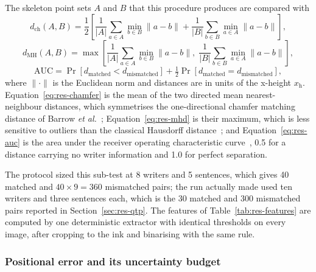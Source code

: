 The skeleton point sets $A$ and $B$ that this procedure produces are compared with
\begin{equation}
\label{eq:res-chamfer}
d_{\mathrm{ch}}(A,B)=\frac{1}{2}\left[\frac{1}{\lvert A\rvert}\sum_{a\in A}\min_{b\in B}\lVert a-b\rVert+\frac{1}{\lvert B\rvert}\sum_{b\in B}\min_{a\in A}\lVert a-b\rVert\right],
\end{equation}
\begin{equation}
\label{eq:res-mhd}
d_{\mathrm{MH}}(A,B)=\max\left[\frac{1}{\lvert A\rvert}\sum_{a\in A}\min_{b\in B}\lVert a-b\rVert,\;\frac{1}{\lvert B\rvert}\sum_{b\in B}\min_{a\in A}\lVert a-b\rVert\right],
\end{equation}
\begin{equation}
\label{eq:res-auc}
\mathrm{AUC}=\Pr\left[d_{\mathrm{matched}}<d_{\mathrm{mismatched}}\right]+\tfrac{1}{2}\Pr\left[d_{\mathrm{matched}}=d_{\mathrm{mismatched}}\right],
\end{equation}
where $\lVert\cdot\rVert$ is the Euclidean norm and distances are in units of the x-height $x_{\mathrm{h}}$.
Equation~\ref{eq:res-chamfer} is the mean of the two directed mean nearest-neighbour distances, which symmetrises the one-directional chamfer matching distance of Barrow \emph{et al.}~\cite[pp.~659--660]{barrow1977}; Equation~\ref{eq:res-mhd} is their maximum, which is less sensitive to outliers than the classical Hausdorff distance~\cite{dubuisson1994}; and Equation~\ref{eq:res-auc} is the area under the receiver operating characteristic curve~\cite[p.~868]{fawcett2006}, 0.5 for a distance carrying no writer information and 1.0 for perfect separation.


The protocol sized this sub-test at 8 writers and 5 sentences, which gives 40 matched and $40\times9=360$ mismatched pairs; the run actually made used ten writers and three sentences each, which is the 30 matched and 300 mismatched pairs reported in Section~\ref{sec:res-qtp}.
The features of Table~\ref{tab:res-features} are computed by one deterministic extractor with identical thresholds on every image, after cropping to the ink and binarising with the same rule.

\subsubsection{Positional error and its uncertainty budget}

